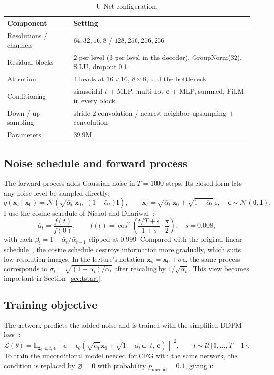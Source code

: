 \documentclass[11pt]{article}
\newcommand{\abar}{\bar{\alpha}}
\newcommand{\eps}{\boldsymbol{\epsilon}}
\newcommand{\x}{\mathbf{x}}
\newcommand{\cvec}{\mathbf{c}}
\begin{document}
\begin{table}[H]
\centering\small
\begin{tabular}{ll}
\toprule
Component & Setting \\
\midrule
Resolutions / channels & $64,32,16,8$ \;/\; $128, 256, 256, 256$ \\
Residual blocks & 2 per level (3 per level in the decoder), GroupNorm(32), SiLU, dropout 0.1 \\
Attention & 4 heads at $16\times16$, $8\times8$, and the bottleneck \\
Conditioning & sinusoidal $t$ + MLP, multi-hot $\cvec$ + MLP, summed, FiLM in every block \\
Down / up sampling & stride-2 convolution / nearest-neighbor upsampling + convolution \\
Parameters & 39.9M \\
\bottomrule
\end{tabular}
\caption{U-Net configuration.}
\label{tab:arch}
\end{table}

\subsection{Noise schedule and forward process}
The forward process adds Gaussian noise in $T=1000$ steps. Its closed form lets any
noise level be sampled directly:
\begin{equation}
q(\x_t\mid\x_0)=\mathcal{N}\!\left(\sqrt{\abar_t}\,\x_0,\;(1-\abar_t)\mathbf{I}\right),
\qquad
\x_t=\sqrt{\abar_t}\,\x_0+\sqrt{1-\abar_t}\,\eps,\quad \eps\sim\mathcal{N}(\mathbf{0},\mathbf{I}).
\end{equation}
I use the cosine schedule of Nichol and Dhariwal~\cite{nichol2021}:
\begin{equation}
\abar_t=\frac{f(t)}{f(0)},\qquad f(t)=\cos^2\!\left(\frac{t/T+s}{1+s}\cdot\frac{\pi}{2}\right),\quad s=0.008,
\end{equation}
with each $\beta_t = 1-\abar_t/\abar_{t-1}$ clipped at 0.999. Compared with the original
linear schedule~\cite{ho2020}, the cosine schedule destroys information more gradually,
which suits low-resolution images. In the lecture's notation $\x_\sigma=\x_0+\sigma\eps$,
the same process corresponds to $\sigma_t=\sqrt{(1-\abar_t)/\abar_t}$ after rescaling by
$1/\sqrt{\abar_t}$. This view becomes important in Section~\ref{sec:tstart}.

\subsection{Training objective}
The network predicts the added noise and is trained with the simplified DDPM
loss~\cite{ho2020}:
\begin{equation}
\mathcal{L}(\theta)=\mathbb{E}_{\x_0,\cvec,t,\eps}\left\|\eps-\eps_\theta\!\left(\sqrt{\abar_t}\x_0+\sqrt{1-\abar_t}\eps,\;t,\;\tilde{\cvec}\right)\right\|^2,
\qquad t\sim\mathcal{U}\{0,\dots,T-1\}.
\end{equation}
To train the unconditional model needed for CFG with the same network, the condition is
replaced by $\varnothing=\mathbf{0}$ with probability $p_\text{uncond}=0.1$, giving
$\tilde{\cvec}$~\cite{ho2022cfg}.
\end{document}
